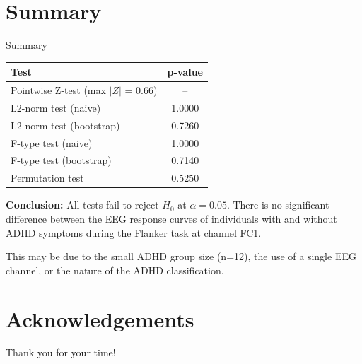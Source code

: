 \documentclass[10pt]{beamer}
\begin{document}
\section{Summary}
\begin{frame}{Summary}

\begin{table}[h]
\centering
\begin{tabular}{l c}
\hline
\textbf{Test} & \textbf{p-value} \\
\hline
Pointwise Z-test (max $|Z|$ = 0.66) & -- \\
L2-norm test (naive) & 1.0000 \\
L2-norm test (bootstrap) & 0.7260 \\
F-type test (naive) & 1.0000 \\
F-type test (bootstrap) & 0.7140 \\
Permutation test & 0.5250 \\
\hline
\end{tabular}
\end{table}

\vspace{0.3cm}

\textbf{Conclusion:} All tests fail to reject $H_0$ at $\alpha = 0.05$. There is no significant difference between the EEG response curves of individuals with and without ADHD symptoms during the Flanker task at channel FC1.

\vspace{0.3cm}

{\small This may be due to the small ADHD group size (n=12), the use of a single EEG channel, or the nature of the ADHD classification.}

\end{frame}





\section*{Acknowledgements}
\begin{frame}
\textcolor{myNewColorA}{\Huge{\centerline{Thank you for your time!}}}

\end{frame}
\end{document}
